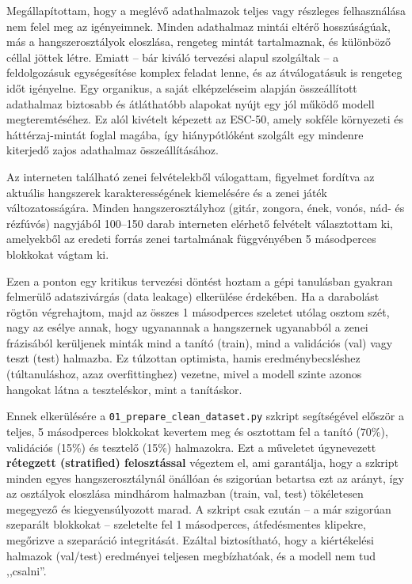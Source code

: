 Megállapítottam, hogy a meglévő adathalmazok teljes vagy részleges felhasználása nem felel meg az igényeimnek. Minden adathalmaz mintái eltérő hosszúságúak, más a hangszerosztályok eloszlása, rengeteg mintát tartalmaznak, és különböző céllal jöttek létre. Emiatt – bár kiváló tervezési alapul szolgáltak – a feldolgozásuk egységesítése komplex feladat lenne, és az átválogatásuk is rengeteg időt igényelne. Egy organikus, a saját elképzeléseim alapján összeállított adathalmaz biztosabb és átláthatóbb alapokat nyújt egy jól működő modell megteremtéséhez. 
Ez alól kivételt képezett az ESC-50, amely sokféle környezeti és háttérzaj-mintát foglal magába, így hiánypótlóként szolgált egy mindenre kiterjedő zajos adathalmaz összeállításához.

Az interneten található zenei felvételekből válogattam, figyelmet fordítva az aktuális hangszerek karakterességének kiemelésére és a zenei játék változatosságára. Minden hangszerosztályhoz (gitár, zongora, ének, vonós, nád- és rézfúvós) nagyjából 100--150 darab interneten elérhető felvételt választottam ki, amelyekből az eredeti forrás zenei tartalmának függvényében 5 másodperces blokkokat vágtam ki. 

Ezen a ponton egy kritikus tervezési döntést hoztam a gépi tanulásban gyakran felmerülő adatszivárgás (data leakage) elkerülése érdekében. Ha a darabolást rögtön végrehajtom, majd az összes 1 másodperces szeletet utólag osztom szét, nagy az esélye annak, hogy ugyanannak a hangszernek ugyanabból a zenei frázisából kerüljenek minták mind a tanító (train), mind a validációs (val) vagy teszt (test) halmazba. Ez túlzottan optimista, hamis eredménybecsléshez (túltanuláshoz, azaz overfittinghez) vezetne, mivel a modell szinte azonos hangokat látna a teszteléskor, mint a tanításkor.

Ennek elkerülésére a \texttt{01\_prepare\_clean\_dataset.py} szkript segítségével először a teljes, 5 másodperces blokkokat kevertem meg és osztottam fel a tanító (70\%), validációs (15\%) és tesztelő (15\%) halmazokra. Ezt a műveletet úgynevezett \textbf{rétegzett (stratified) felosztással} végeztem el, ami garantálja, hogy a szkript minden egyes hangszerosztálynál önállóan és szigorúan betartsa ezt az arányt, így az osztályok eloszlása mindhárom halmazban (train, val, test) tökéletesen megegyező és kiegyensúlyozott marad. A szkript csak ezután – a már szigorúan szeparált blokkokat – szeletelte fel 1 másodperces, átfedésmentes klipekre, megőrizve a szeparáció integritását. Ezáltal biztosítható, hogy a kiértékelési halmazok (val/test) eredményei teljesen megbízhatóak, és a modell nem tud ,,csalni''.

